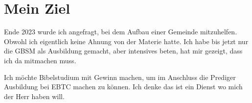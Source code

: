 \documentclass{../../inc/mybib}
\begin{document}
\section*{Mein Ziel}
Ende 2023 wurde ich angefragt, bei dem Aufbau einer Gemeinde mitzuhelfen. Obwohl ich eigentlich keine Ahnung von der Materie hatte. Ich habe bis jetzt \glqq nur\grqq{} die GBSM als Ausbildung gemacht, aber intensives beten, hat mir gezeigt, dass ich da mitmachen muss.

Ich möchte Bibelstudium mit Gewinn machen, um im Anschluss die Prediger Ausbildung bei EBTC machen zu können. Ich denke das ist ein Dienst wo mich der Herr haben will. 
\end{document}
